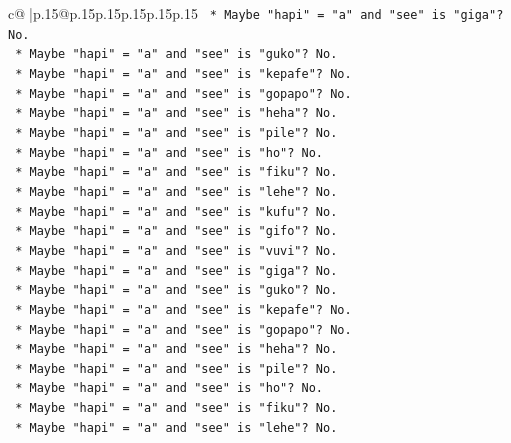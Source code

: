 \documentclass{article}
\begin{document}
{\begin{supertabular}{c@{$\;$}|p{.15\linewidth}@{}p{.15\linewidth}p{.15\linewidth}p{.15\linewidth}p{.15\linewidth}p{.15\linewidth}}
{{{\texttt{                        *   Maybe "hapi" = "a" and "see" is "giga"? No.} \\
\texttt{                        *   Maybe "hapi" = "a" and "see" is "guko"? No.} \\
\texttt{                        *   Maybe "hapi" = "a" and "see" is "kepafe"? No.} \\
\texttt{                        *   Maybe "hapi" = "a" and "see" is "gopapo"? No.} \\
\texttt{                        *   Maybe "hapi" = "a" and "see" is "heha"? No.} \\
\texttt{                        *   Maybe "hapi" = "a" and "see" is "pile"? No.} \\
\texttt{                        *   Maybe "hapi" = "a" and "see" is "ho"? No.} \\
\texttt{                        *   Maybe "hapi" = "a" and "see" is "fiku"? No.} \\
\texttt{                        *   Maybe "hapi" = "a" and "see" is "lehe"? No.} \\
\texttt{                        *   Maybe "hapi" = "a" and "see" is "kufu"? No.} \\
\texttt{                        *   Maybe "hapi" = "a" and "see" is "gifo"? No.} \\
\texttt{                        *   Maybe "hapi" = "a" and "see" is "vuvi"? No.} \\
\texttt{                        *   Maybe "hapi" = "a" and "see" is "giga"? No.} \\
\texttt{                        *   Maybe "hapi" = "a" and "see" is "guko"? No.} \\
\texttt{                        *   Maybe "hapi" = "a" and "see" is "kepafe"? No.} \\
\texttt{                        *   Maybe "hapi" = "a" and "see" is "gopapo"? No.} \\
\texttt{                        *   Maybe "hapi" = "a" and "see" is "heha"? No.} \\
\texttt{                        *   Maybe "hapi" = "a" and "see" is "pile"? No.} \\
\texttt{                        *   Maybe "hapi" = "a" and "see" is "ho"? No.} \\
\texttt{                        *   Maybe "hapi" = "a" and "see" is "fiku"? No.} \\
\texttt{                        *   Maybe "hapi" = "a" and "see" is "lehe"? No.} \\
}}}
\end{supertabular}}
\end{document}
